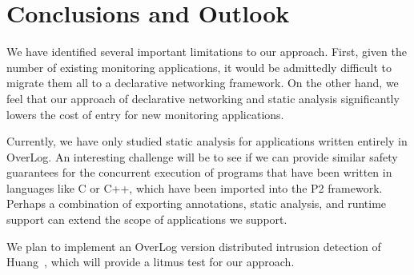 \documentclass[10pt,twocolumn]{MyTightStyle}
\begin{document}
\section{Conclusions and Outlook}

We have identified several important limitations to our approach. First, given the number of existing monitoring applications, it would be admittedly difficult to migrate them all to a declarative networking framework. On the other hand, we feel that our approach of declarative networking and static analysis significantly lowers the cost of entry for new monitoring applications.

Currently, we have only studied static analysis for applications written entirely in OverLog. An interesting challenge will be to see if we can provide similar safety guarantees for the concurrent execution of programs that have been written in languages like C or C++, which have been imported into the P2 framework. Perhaps a combination of exporting annotations, static analysis, and runtime support can extend the scope of applications we support.

We plan to implement an OverLog version distributed intrusion detection of Huang~\cite{huang07}, which will provide a litmus test for our approach.


{\footnotesize


}
\end{document}
